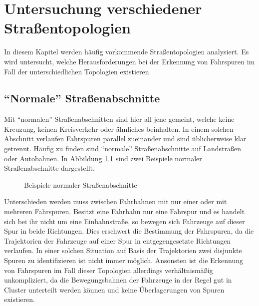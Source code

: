 
\chapter{Untersuchung verschiedener Straßentopologien}
\label{cha:street_topologies}


In diesem Kapitel werden häufig vorkommende Straßentopologien analysiert.
Es wird untersucht, welche Herausforderungen bei der Erkennung von Fahrspuren im Fall der unterschiedlichen
Topologien existieren.

\section{``Normale'' Straßenabschnitte}

Mit ``normalen'' Straßenabschnitten sind hier all jene gemeint, welche keine Kreuzung, keinen Kreisverkehr
oder ähnliches beinhalten. In einem solchen Abschnitt verlaufen Fahrspuren parallel zueinander und sind
üblicherweise klar getrennt.
Häufig zu finden sind ``normale'' Straßenabschnitte auf Landstraßen oder Autobahnen. In Abbildung
\ref{fig:topos_normal_lanes} sind zwei Beispiele normaler Straßenabschnitte dargestellt.

\begin{figure}[H]
    \centering
    \qquad \qquad
    \caption{Beispiele normaler Straßenabschnitte}
    \label{fig:topos_normal_lanes}
\end{figure}

Unterschieden werden muss zwischen Fahrbahnen mit nur einer oder mit mehreren Fahrspuren. Besitzt
eine Fahrbahn nur eine Fahrspur und es handelt sich bei ihr nicht um eine Einbahnstraße, so bewegen
sich Fahrzeuge auf dieser Spur in beide Richtungen. Dies erschwert die Bestimmung der Fahrspuren,
da die Trajektorien der Fahrzeuge auf einer Spur in entgegengesetzte Richtungen verlaufen.
In einer solchen Situation auf Basis der Trajektorien zwei disjunkte Spuren zu identifizieren ist nicht immer möglich.
Ansonsten ist die Erkennung von Fahrspuren im Fall dieser Topologien allerdings verhältnismäßig unkompliziert,
da die Bewegungsbahnen der Fahrzeuge in der Regel gut in Cluster unterteilt werden können und keine Überlagerungen
von Spuren existieren.


